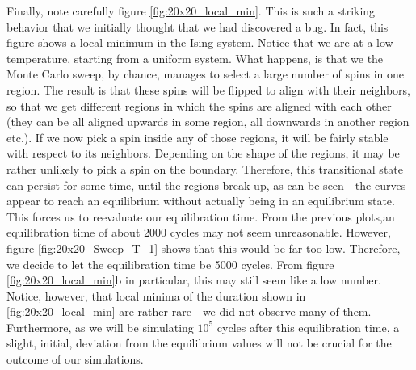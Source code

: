 \documentclass[a4paper, 10pt]{article}
\begin{document}
\linebreak
Finally, note carefully figure \ref{fig:20x20_local_min}. This is such a striking behavior that we initially thought that we had discovered a bug. In fact, this figure shows a local minimum in the Ising system. Notice that we are at a low temperature, starting from a uniform system. What happens, is that we the Monte Carlo sweep, by chance, manages to select a large number of spins in one region. The result is that these spins will be flipped to align with their neighbors, so that we get different regions in which the spins are aligned with each other (they can be all aligned upwards in some region, all downwards in another region etc.). If we now pick a spin inside any of those regions, it will be fairly stable with respect to its neighbors. Depending on the shape of the regions, it may be rather unlikely to pick a spin on the boundary. Therefore, this transitional  state can persist for some time, until the regions break up, as can be seen - the curves appear to reach an equilibrium without actually being in an equilibrium state. This forces us to reevaluate our equilibration time. From the previous plots,an equilibration time of about 2000 cycles may not seem unreasonable. However, figure \ref{fig:20x20_Sweep_T_1} shows that this would be far too low. Therefore, we decide to let the equilibration time be 5000 cycles. From figure \ref{fig:20x20_local_min}b in particular, this may still seem like a low number. Notice, however, that local minima of the duration shown in \ref{fig:20x20_local_min} are rather rare - we did not observe many of them. Furthermore, as we will be simulating $10^5$ cycles after this equilibration time, a slight, initial, deviation from the equilibrium values will not be crucial for the outcome of our simulations.
\end{document}
